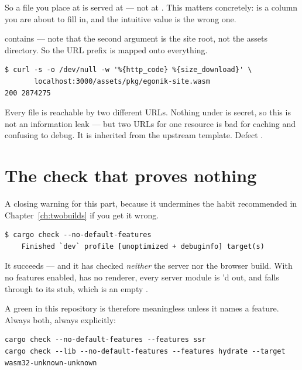 So a file you place at  is served at \textbf{} --- not
at . This matters concretely: 
is a column you are about to fill in, and the intuitive value is the wrong one.

\begin{pitfall}
 contains  --- note that the second argument
is the site root, not the assets directory. So the URL prefix  is mapped onto
everything.
\begin{lstlisting}[style=out]
$ curl -s -o /dev/null -w '%{http_code} %{size_download}' \
       localhost:3000/assets/pkg/egonik-site.wasm
200 2874275
\end{lstlisting}
Every file is reachable by two different URLs. Nothing under  is secret, so this
is not an information leak --- but two URLs for one resource is bad for caching and confusing to
debug. It is inherited from the upstream template. Defect .
\end{pitfall}

\section{The check that proves nothing}

A closing warning for this part, because it undermines the habit recommended in
Chapter~\ref{ch:twobuilds} if you get it wrong.

\begin{verified}
\begin{lstlisting}[style=out]
$ cargo check --no-default-features
    Finished `dev` profile [unoptimized + debuginfo] target(s)
\end{lstlisting}
It succeeds --- and it has checked \emph{neither} the server nor the browser build. With no features
enabled,  has no renderer, every server module is 'd out, and
 falls through to its \code{\#[cfg(not(any(feature = "ssr", feature = "csr")))]} stub,
which is an empty .
\end{verified}

A green  in this repository is therefore meaningless unless it names a feature.
Always both, always explicitly:

\begin{lstlisting}[style=sh]
cargo check --no-default-features --features ssr
cargo check --lib --no-default-features --features hydrate --target wasm32-unknown-unknown
\end{lstlisting}
